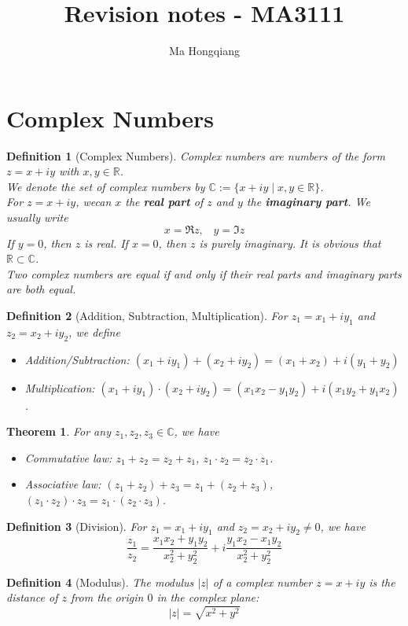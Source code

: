 \documentclass[12pt]{article}
\newtheorem{definition}{Definition}[section]
\newtheorem{theorem}{Theorem}[section]
\theoremstyle{definition}
\begin{document}
\twocolumn
\title{Revision notes - MA3111}
\author{Ma Hongqiang}
\section{Complex Numbers}
\begin{definition}[Complex Numbers]
\normalfont Complex numbers are numbers of the form $z=x+iy$ with $x,y\in\mathbb{R}$.\\
We denote the set of complex numbers by $\mathbb{C}:=\{x+iy\mid x,y\in\mathbb{R}\}$.\\
For $z=x+iy$, wecan $x$ the \textbf{real part} of $z$ and $y$ the \textbf{imaginary part}. We usually write
\[
x=\Re z, \;\;\;y=\Im z
\]
If $y=0$, then $z$ is real. If $x=0$, then $z$ is purely imaginary. It is obvious that $\mathbb{R}\subset\mathbb{C}$.\\
Two complex numbers are equal if and only if their real parts and imaginary parts are both equal.
\end{definition}
\begin{definition}[Addition, Subtraction, Multiplication]
\normalfont
For $z_1=x_1+iy_1$ and $z_2=x_2+iy_2$, we define 
\begin{itemize}
	\item Addition/Subtraction: $(x_1+iy_1) + (x_2+iy_2)= (x_1 + x_2) + i(y_1 + y_2)$
	\item Multiplication: $(x_1+iy_1)\cdot (x_2+iy_2) = (x_1x_2-y_1y_2)+i(x_1y_2+y_1x_2)$.
\end{itemize}
\end{definition}
\begin{theorem}
\normalfont For any $z_1,z_2,z_3\in\mathbb{C}$, we have
\begin{itemize}
	\item Commutative law: $z_1 + z_2 = z_2 + z_1$, $z_1\cdot z_2 = z_2\cdot z_1$.
	\item Associative law: $(z_1+z_2)+z_3 = z_1+(z_2+z_3)$, $(z_1\cdot z_2)\cdot z_3 = z_1\cdot(z_2\cdot z_3)$.
\end{itemize}
\end{theorem}
\begin{definition}[Division]
\normalfont For $z_1=x_1+iy_1$ and $z_2=x_2+iy_2\neq 0$, we have
\[
\frac{z_1}{z_2} = \frac{x_1x_2+y_1y_2}{x_2^2+y_2^2} + i\frac{y_1x_2-x_1y_2}{x_2^2+y_2^2}
\]
\end{definition}
\begin{definition}[Modulus]
\normalfont The modulus $|z|$ of a complex number $z=x+iy$ is the distance of $z$ from the origin $0$ in the complex plane:
\[
|z|=\sqrt{x^2 + y^2}
\]
\end{definition}
\end{document}
